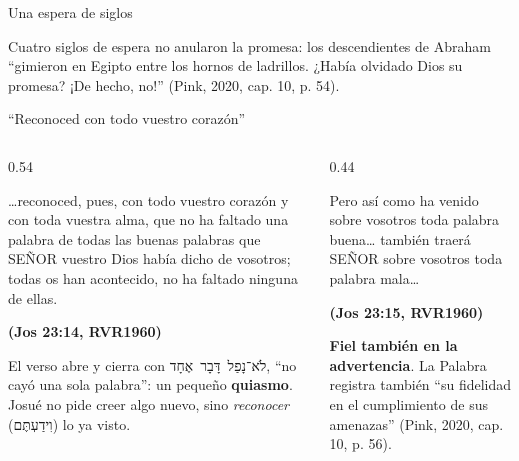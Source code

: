 \documentclass[hyperref={bookmarks=false},aspectratio=169]{beamer}
\newcommand{\heb}[1]{\mbox{\foreignlanguage{hebrew}{#1}}}
\newcommand{\SENOR}{S{\fontsize{0.78em}{1em}\selectfont EÑOR}}
\newcommand{\fuente}[1]{\par\hfill{\upshape\bfseries\footnotesize\textcolor{azul}{#1}}}
\newcommand{\destacar}[1]{\textbf{\textcolor{azul}{#1}}}
\begin{document}
\begin{frame}{Una espera de siglos}
\centering
{}\par\medskip
\small Cuatro siglos de espera no anularon la promesa: los descendientes de Abraham ``gimieron en Egipto entre los hornos de ladrillos. ¿Había olvidado Dios su promesa? ¡De hecho, no!'' (Pink, 2020, cap. 10, p. 54).
\end{frame}

\begin{frame}{``Reconoced con todo vuestro corazón''}
\begin{columns}[t,onlytextwidth]
\begin{column}{0.54\textwidth}
\begin{cita}\ldots{}reconoced, pues, con todo vuestro corazón y con toda vuestra alma, que no ha faltado una palabra de todas las buenas palabras que \SENOR{} vuestro Dios había dicho de vosotros; todas os han acontecido, no ha faltado ninguna de ellas.\fuente{(Jos 23:14, RVR1960)}\end{cita}
\scriptsize El verso abre y cierra con \heb{לֹא־נָפַל דָּבָר אֶחָד}, ``no cayó una sola palabra'': un pequeño \destacar{quiasmo}. Josué no pide creer algo nuevo, sino \emph{reconocer} (\heb{וִידַעְתֶּם}) lo ya visto.
\end{column}
\begin{column}{0.44\textwidth}
\begin{cita}Pero así como ha venido sobre vosotros toda palabra buena\ldots{} también traerá \SENOR{} sobre vosotros toda palabra mala\ldots\fuente{(Jos 23:15, RVR1960)}\end{cita}
\scriptsize\destacar{Fiel también en la advertencia}. La Palabra registra también ``su fidelidad en el cumplimiento de sus amenazas'' (Pink, 2020, cap. 10, p. 56).
\end{column}
\end{columns}
\end{frame}
\end{document}
